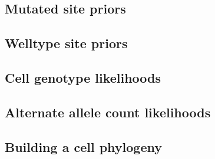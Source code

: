 \documentclass[../main.tex]{subfiles}
\begin{document}


%

\subsection{Mutated site priors}


\subsection{Welltype site priors}


\subsection{Cell genotype likelihoods}


\subsection{Alternate allele count likelihoods}


\subsection{Building a cell phylogeny}


\end{document}
